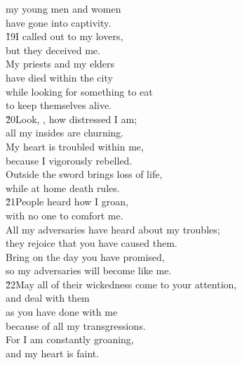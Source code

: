 \begin{poetry}
\poeml my young men and women \\
\poemll    have gone into captivity. \\
\poeml \v{19}I called out to my lovers, \\
\poemll    but they deceived me. \\
\poeml My priests and my elders \\
\poemll    have died within the city \\
\poeml while looking for something to eat \\
\poemll    to keep themselves alive. \\
\poeml \v{20}Look, , how distressed I am; \\
\poemll    all my insides are churning. \\
\poeml My heart is troubled within me, \\
\poemll    because I vigorously rebelled. \\
\poeml Outside the sword brings loss of life, \\
\poemll    while at home death rules. \\
\poeml \v{21}People heard how I groan, \\
\poemll    with no one to comfort me. \\
\poeml All my adversaries have heard about my troubles; \\
\poemll    they rejoice that you have caused them. \\
\poeml Bring on the day you have promised, \\
\poemll    so my adversaries will become like me. \\
\poeml \v{22}May all of their wickedness come to your attention, \\
\poemll    and deal with them \\
\poeml as you have done with me \\
\poemll    because of all my transgressions. \\
\poeml For I am constantly groaning, \\
\poemll    and my heart is faint.
\end{poetry}

